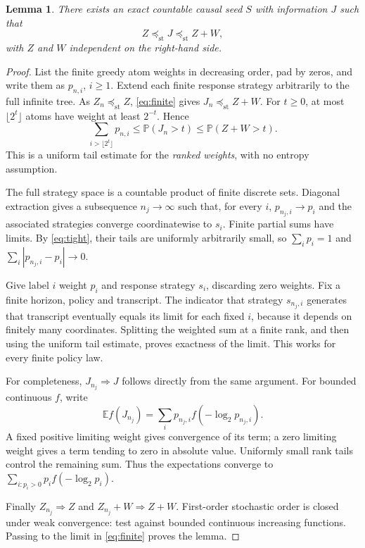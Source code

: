 \documentclass[11pt,a4paper]{article}
\newtheorem{lemma}[theorem]{Lemma}
\newcommand{\E}{\mathbb E}
\newcommand{\Pp}{\mathbb P}
\newcommand{\st}{\preceq_{\mathrm{st}}}
\begin{document}
\begin{lemma}\label{lem:limit}
There exists an exact countable causal seed $S$ with information $J$ such that
\[
 \boxed{Z\st J\st Z+W,}
\]
with $Z$ and $W$ independent on the right-hand side.
\end{lemma}
\begin{proof}
List the finite greedy atom weights in decreasing order, pad by zeros, and
write them as $p_{n,i}$, $i\ge1$. Extend each finite response strategy
arbitrarily to the full infinite tree. As $Z_n\st Z$, \eqref{eq:finite} gives
$J_n\st Z+W$. For $t\ge0$, at most $\lfloor2^t\rfloor$ atoms have weight
at least $2^{-t}$. Hence
\begin{equation}\label{eq:tight}
 \sum_{i>\lfloor2^t\rfloor}p_{n,i}
 \le \Pp(J_n>t)\le\Pp(Z+W>t).
\end{equation}
This is a uniform tail estimate for the \emph{ranked weights}, with no
entropy assumption.

The full strategy space is a countable product of finite discrete sets.
Diagonal extraction gives a subsequence $n_j\to\infty$ such that, for every
$i$, $p_{n_j,i}\to p_i$ and the associated strategies converge coordinatewise
to $s_i$. Finite partial sums have limits. By \eqref{eq:tight}, their tails
are uniformly arbitrarily small, so $\sum_i p_i=1$ and
$\sum_i|p_{n_j,i}-p_i|\to0$.

Give label $i$ weight $p_i$ and response strategy $s_i$, discarding zero
weights. Fix a finite horizon, policy and transcript. The indicator that
strategy $s_{n_j,i}$ generates that transcript eventually equals its limit
for each fixed $i$, because it depends on finitely many coordinates.
Splitting the weighted sum at a finite rank, and then using the uniform
tail estimate, proves exactness of the limit. This works for every finite
policy law.

For completeness, $J_{n_j}\Rightarrow J$ follows directly from the same
argument. For bounded continuous $f$, write
\[
 \E f(J_{n_j})=\sum_i p_{n_j,i}f(-\log_2p_{n_j,i}).
\]
A fixed positive limiting weight gives convergence of its term; a zero
limiting weight gives a term tending to zero in absolute value. Uniformly
small rank tails control the remaining sum. Thus the expectations converge
to $\sum_{i:p_i>0}p_i f(-\log_2p_i)$.

Finally $Z_{n_j}\Rightarrow Z$ and $Z_{n_j}+W\Rightarrow Z+W$.
First-order stochastic order is closed under weak convergence: test against
bounded continuous increasing functions. Passing to the limit in
\eqref{eq:finite} proves the lemma.
\end{proof}
\end{document}
